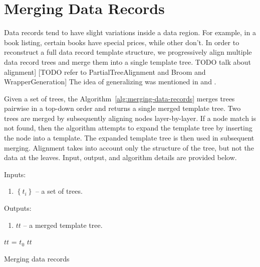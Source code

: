 \section{Merging Data Records}

Data records tend to have slight variations inside a data region. For example, in a book listing, certain books have special prices, while other don't. In order to reconstruct a full data record template structure, we progressively align multiple data record trees and merge them into a single template tree. TODO talk about alignment] [TODO refer to PartialTreeAlignment and Broom and WrapperGeneration] The idea of generalizing was mentioned in \cite{zheng2007a} and \cite{song2009a}.

Given a set of trees, the Algorithm~\ref{alg:merging-data-records} merges trees pairwise in a top-down order and returns a single merged template tree. Two trees are merged by subsequently aligning nodes layer-by-layer. If a node match is not found, then the algorithm attempts to expand the template tree by inserting the node into a template. The expanded template tree is then used in subsequent merging. Alignment takes into account only the structure of the tree, but not the data at the leaves. Input, output, and algorithm details are provided below.

Inputs: 

\begin{enumerate}
	\item $\left\{t_i\right\}$ -- a set of trees.
\end{enumerate}

Outputs: 

\begin{enumerate}
	\item $tt$ -- a merged template tree.
\end{enumerate}


\IncMargin{2em}
\begin{algorithm}[h]

	\DontPrintSemicolon

	\BlankLine

	$tt$ = $t_0$ \;
	\Return $tt$ \;

	\caption{Merging data records}
	\label{alg:merging-data-records}

\end{algorithm}
\DecMargin{2em}

